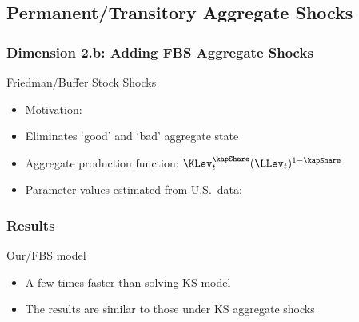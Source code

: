 \subsection{Permanent/Transitory Aggregate Shocks}
\begin{frame}
\frametitle{{Dimension 2.b: Adding FBS Aggregate Shocks}}
\begin{scriptsize}
\begin{block}{Friedman/Buffer Stock Shocks}
\begin{itemize}
  \item Motivation:\\ 
  \item Eliminates `good' and `bad' aggregate state
  \item Aggregate production function: \pause $\KLev_{t}^{\kapShare}(\LLev_{t})^{1-\kapShare}$
\begin{itemize}
\end{itemize}
  \item Parameter values estimated from U.S.\ data:
  \begin{table}
  \begin{center}
  
    \end{center}
   \end{table}
\end{itemize}
\end{block}
\end{scriptsize}
\end{frame}

\begin{frame}
\frametitle{{Results}}

\begin{block}{Our/FBS model}
\begin{itemize}
    \item A few times faster than solving KS model
    \hfill
    \item The results are similar to those under KS aggregate shocks
\end{itemize}
\end{block}
\end{frame}

